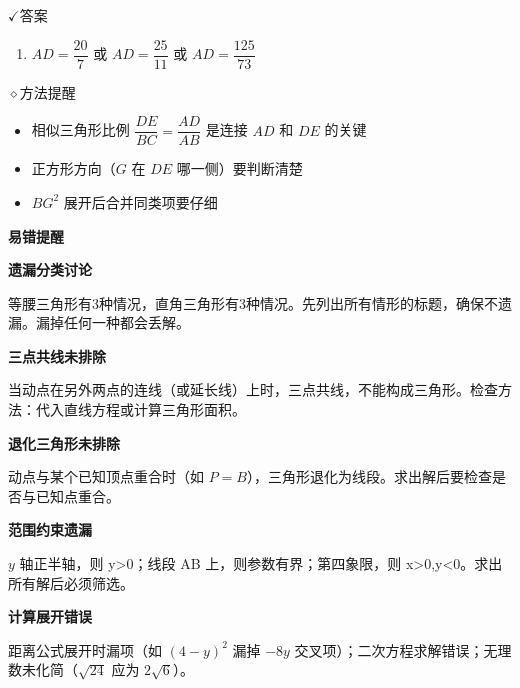 \documentclass{exam-zh}
\newcommand{\eduSectionTitle}[1]{%
  \needspace{5\baselineskip}%
  \vspace{2mm}
  {\color{edu-blue}\bfseries\large #1}\par
  \vspace{3mm}
}
\newcommand{\eduSubTitle}[1]{%
  \needspace{4\baselineskip}%
  \vspace{1mm}
  {\color{edu-blue}\bfseries #1}\par
  \vspace{1mm}
}
\newcommand{\eduIconCheck}{\(\checkmark\)}
\newcommand{\eduIconPin}{\(\diamond\)}
\newenvironment{eduBulletList}{%
  \begin{itemize}[
    label=\textbullet,
    leftmargin=5mm,
    itemsep=1.2mm,
    topsep=0pt,
    parsep=0pt
  ]
}{%
  \end{itemize}
}
\newenvironment{eduBottomGrid}{%
  \vspace{1mm}
  \par\noindent
}{%
  \par\vspace{1mm}
}
\newenvironment{eduSummaryLeft}{%
  \begin{minipage}[t]{0.30\linewidth}
}{%
  \end{minipage}
}
\newcommand{\eduSummaryDivider}{%
  \hspace{4mm}{\color{edu-line}\vrule width 0.35pt}\hspace{7mm}%
}
\newenvironment{eduSummaryRight}{%
  \begin{minipage}[t]{0.58\linewidth}
}{%
  \end{minipage}
}
\newenvironment{eduPlainList}{%
  \begin{enumerate}[
    label=(\arabic*),
    leftmargin=7mm,
    itemsep=1.2mm,
    topsep=0pt,
    parsep=0pt
  ]
}{%
  \end{enumerate}
}
\begin{document}
\begin{eduBottomGrid}
  \begin{eduSummaryLeft}
    \begin{eduSummaryBlock}{\eduIconCheck}{答案}
    \begin{eduPlainList}
      \item $AD = \dfrac{20}{7}$ 或 $AD = \dfrac{25}{11}$ 或 $AD = \dfrac{125}{73}$    \end{eduPlainList}
    \end{eduSummaryBlock}
  \end{eduSummaryLeft}
  \eduSummaryDivider
  \begin{eduSummaryRight}
    \begin{eduSummaryBlock}{\eduIconPin}{方法提醒}
    \begin{eduBulletList}
      \item 相似三角形比例 $\dfrac{DE}{BC} = \dfrac{AD}{AB}$ 是连接 $AD$ 和 $DE$ 的关键      \item 正方形方向（$G$ 在 $DE$ 哪一侧）要判断清楚      \item $BG^2$ 展开后合并同类项要仔细    \end{eduBulletList}
    \end{eduSummaryBlock}
  \end{eduSummaryRight}
\end{eduBottomGrid}



\eduSectionTitle{易错提醒}

\begin{eduMistakeBox}
\eduSubTitle{遗漏分类讨论}等腰三角形有3种情况，直角三角形有3种情况。先列出所有情形的标题，确保不遗漏。漏掉任何一种都会丢解。\end{eduMistakeBox}




\begin{eduMistakeBox}
\eduSubTitle{三点共线未排除}当动点在另外两点的连线（或延长线）上时，三点共线，不能构成三角形。检查方法：代入直线方程或计算三角形面积。\end{eduMistakeBox}




\begin{eduMistakeBox}
\eduSubTitle{退化三角形未排除}动点与某个已知顶点重合时（如 $P=B$），三角形退化为线段。求出解后要检查是否与已知点重合。\end{eduMistakeBox}




\begin{eduMistakeBox}
\eduSubTitle{范围约束遗漏}$y$ 轴正半轴，则 y>0；线段 AB 上，则参数有界；第四象限，则 x>0,y<0。求出所有解后必须筛选。\end{eduMistakeBox}




\begin{eduMistakeBox}
\eduSubTitle{计算展开错误}距离公式展开时漏项（如 $(4-y)^2$ 漏掉 $-8y$ 交叉项）；二次方程求解错误；无理数未化简（$\sqrt{24}$ 应为 $2\sqrt{6}$）。\end{eduMistakeBox}
\end{document}
